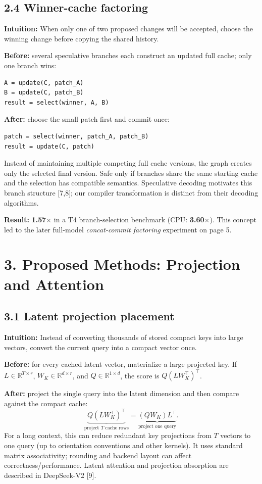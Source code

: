 \documentclass[10pt,a4paper]{article}
\begin{document}
\subsection*{2.4 Winner-cache factoring}
\textbf{Intuition:} When only one of two proposed changes will be accepted, choose the winning change before copying the shared history.\par\textbf{Before:} several speculative branches each construct an updated full cache; only one branch wins:
\begin{lstlisting}
A = update(C, patch_A)
B = update(C, patch_B)
result = select(winner, A, B)
\end{lstlisting}
\textbf{After:} choose the small patch first and commit once:
\begin{lstlisting}
patch = select(winner, patch_A, patch_B)
result = update(C, patch)
\end{lstlisting}
Instead of maintaining multiple competing full cache versions, the graph creates only the selected final version. Safe only if branches share the same starting cache and the selection has compatible semantics. Speculative decoding motivates this branch structure [7,8]; our compiler transformation is distinct from their decoding algorithms.

\textbf{Result:} \textbf{1.57$\times$} in a T4 branch-selection benchmark (CPU: \textbf{3.60$\times$}). This concept led to the later full-model \emph{concat-commit factoring} experiment on page 5.
\vspace{-0.5cm}

\section*{3. Proposed Methods: Projection and Attention}
\subsection*{3.1 Latent projection placement}
\textbf{Intuition:} Instead of converting thousands of stored compact keys into large vectors, convert the current query into a compact vector once.\par\textbf{Before:} for every cached latent vector, materialize a large projected key. If $L\in\mathbb{R}^{T\times r}$, $W_K\in\mathbb{R}^{d\times r}$, and $Q\in\mathbb{R}^{1\times d}$, the score is $Q(LW_K^\top)^\top$.

\textbf{After:} project the single query into the latent dimension and then compare against the compact cache:
\[
\underbrace{Q(LW_K^\top)^\top}_{\text{project }T\text{ cache rows}}
=\underbrace{(QW_K)L^\top}_{\text{project one query}}.
\]
For a long context, this can reduce redundant key projections from $T$ vectors to one query (up to orientation conventions and other kernels). It uses standard matrix associativity; rounding and backend layout can affect correctness/performance. Latent attention and projection absorption are described in DeepSeek-V2 [9].
\end{document}
